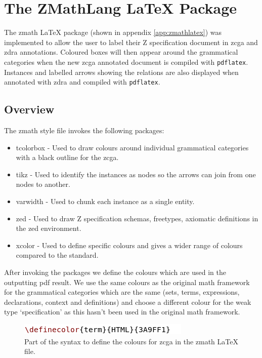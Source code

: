 \section{The ZMathLang LaTeX Package}

The \gls{zmath} \LaTeX{} package (shown in appendix \ref{app:zmathlatex}) was
implemented to allow the user to label their Z specification document in
\gls{zcga} and \gls{zdra} annotations. Coloured boxes will then appear around
the grammatical categories when the new \gls{zcga} annotated document is
compiled with \texttt{pdflatex}. Instances and labelled arrows showing the
relations are also displayed when annotated with \gls{zdra} and compiled with
\texttt{pdflatex}. 

\subsection{Overview}

The \gls{zmath} style file invokes the following packages:

\begin{itemize}
\item tcolorbox - Used to draw colours around individual grammatical categories
with a black outline for the \gls{zcga}.
\item tikz - Used to identify the instances as nodes so the arrows can join from
one nodes to another.
\item varwidth - Used to chunk each instance as a single entity.
\item zed - Used to draw Z specification schemas, freetypes, axiomatic
definitions in the zed environment.
\item xcolor - Used to define specific colours and gives a wider range of
colours compared to the standard.
\end{itemize}

After invoking the packages we define the colours which are used in the
outputting pdf result. We use the same colours as the original \gls{math}
framework for the grammatical categories which are the same (sets, terms,
expressions, declarations, context and definitions) and choose a different
colour for the weak type `specification' as this hasn't been used in the
original \gls{math} framework.

\begin{figure}[H]
\includegraphics[scale=0.7]{Figures/Design/zmatha.png}
\caption{Part of the syntax to define the colours for \gls{zcga} in the \gls{zmath} \LaTeX{} file. \label{fig:definecolourlatex}}
\end{figure}

